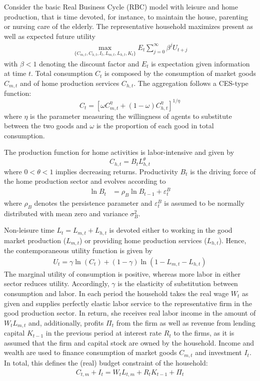 Consider the basic Real Business Cycle (RBC) model with leisure and home production, that is time devoted, for instance, to maintain the house, parenting or nursing care of the elderly. The representative household maximizes present as well as expected future utility
\begin{align*}
    \underset{\{C_{m,t},C_{h,t},I_{t},L_{m,t},L_{h,t},K_{t}\}}{\max} E_t \sum_{j=0}^{\infty} \beta^{j} U_{t+j}
\end{align*}
with $\beta <1$ denoting the discount factor and $E_t$ is expectation given information at time $t$. Total consumption $C_t$ is composed by the consumption of market goods $C_{m,t}$ and of home production services $C_{h,t}$. The aggregation follows a CES-type function:
$$C_t = \left[\omega C_{m,t}^\eta +(1-\omega)C_{h,t}^\eta\right]^{1/\eta}$$
where $\eta$ is the parameter measuring the willingness of agents to substitute between the two goods and $\omega$ is the proportion of each good in total consumption.

The production function for home activities is labor-intensive and given by
$$C_{h,t}=B_t L_{h,t}^\theta$$
where $0<\theta<1$ implies decreasing returns. Productivity $B_t$ is the driving force of the home production sector and evolves according to
\begin{align*}
    \ln{B_{t}} & = \rho_B \ln{B_{t-1}}  + \varepsilon_t^B
\end{align*}
where $\rho_B$ denotes the persistence parameter and $\varepsilon_t^B$ is assumed to be normally distributed with mean zero and variance $\sigma_B^2$.

Non-leisure time $L_t=L_{m,t}+L_{h,t}$ is devoted either to working in the good market production ($L_{m,t}$) or providing home production services ($L_{h,t}$). Hence, the contemporaneous utility function is given by
\begin{align*}
    U_t = \gamma \ln(C_t) + (1-\gamma) \ln{(1-L_{m,t}-L_{h,t})}
\end{align*}
The marginal utility of consumption is positive, whereas more labor in either sector reduces utility. Accordingly, $\gamma$ is the elasticity of substitution between consumption and labor. In each period the household takes the real wage $W_t$ as given and supplies perfectly elastic labor service to the representative firm in the good production sector. In return, she receives real labor income in the amount of $W_t L_{m,t}$ and, additionally, profits $\Pi_t$ from the firm as well as revenue from lending capital $K_{t-1}$ in the previous period at interest rate $R_t$ to the firms, as it is assumed that the firm and capital stock are owned by the household. Income and wealth are used to finance consumption of market goods $C_{m,t}$ and investment $I_t$. In total, this defines the (real) budget constraint of the household:
\begin{align*}
    C_{t,m} + I_t = W_t L_{t,m} + R_t K_{t-1} + \Pi_t
\end{align*}

